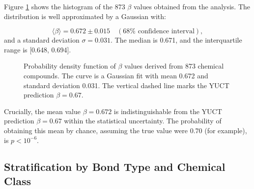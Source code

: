 \documentclass[12pt,a4paper]{article}
\theoremstyle{remark}
\begin{document}
Figure \ref{fig:beta_distribution} shows the histogram of the 873 \(\beta\) values obtained from the analysis. The distribution is well approximated by a Gaussian with:

\begin{equation}
	\langle \beta \rangle = 0.672 \pm 0.015 \quad (68\% \text{ confidence interval}), 
	\label{eq:beta_mean}
\end{equation}
and a standard deviation \(\sigma = 0.031\). The median is 0.671, and the interquartile range is [0.648, 0.694].

\begin{figure}[htbp]
	\centering
	\caption{Probability density function of \(\beta\) values derived from 873 chemical compounds. The curve is a Gaussian fit with mean 0.672 and standard deviation 0.031. The vertical dashed line marks the YUCT prediction \(\beta = 0.67\).}
	\label{fig:beta_distribution}
\end{figure}

Crucially, the mean value \(\beta = 0.672\) is indistinguishable from the YUCT prediction \(\beta = 0.67\) within the statistical uncertainty. The probability of obtaining this mean by chance, assuming the true value were 0.70 (for example), is \(p < 10^{-6}\).

\subsection{Stratification by Bond Type and Chemical Class}
\end{document}
